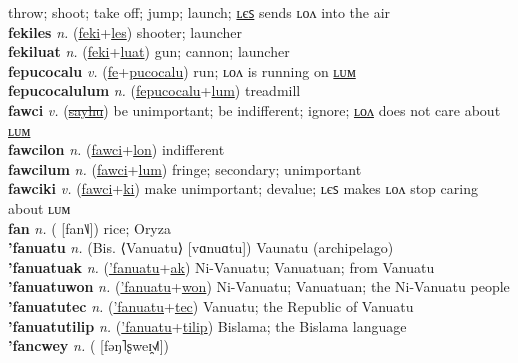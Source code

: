throw; shoot; take off; jump; launch; \hyperref[fekiles]{ʟєꜱ} sends ʟᴏᴧ into the air \label{feki} \\
\textbf{fekiles} \textit{n.} (\hyperref[feki]{feki}+\hyperref[les]{les})
shooter; launcher \label{fekiles} \\
\textbf{fekiluat} \textit{n.} (\hyperref[feki]{feki}+\hyperref[luat]{luat})
gun; cannon; launcher \label{fekiluat} \\
\textbf{fepucocalu} \textit{v.} (\hyperref[fe]{fe}+\hyperref[pucocalu]{pucocalu})
run; ʟᴏᴧ is running on \hyperref[fepucocalulum]{ʟᴜᴍ} \label{fepucocalu} \\
\textbf{fepucocalulum} \textit{n.} (\hyperref[fepucocalu]{fepucocalu}+\hyperref[lum]{lum})
treadmill \label{fepucocalulum} \\
\textbf{fawci} \textit{v.} (\hyperref[sayhu]{\sout{sayhu}})
be unimportant; be indifferent; ignore; \hyperref[fawcilon]{ʟᴏᴧ} does not care about \hyperref[fawcilum]{ʟᴜᴍ} \label{fawci} \\
\textbf{fawcilon} \textit{n.} (\hyperref[fawci]{fawci}+\hyperref[lon]{lon})
indifferent \label{fawcilon} \\
\textbf{fawcilum} \textit{n.} (\hyperref[fawci]{fawci}+\hyperref[lum]{lum})
fringe; secondary; unimportant \label{fawcilum} \\
\textbf{fawciki} \textit{v.} (\hyperref[fawci]{fawci}+\hyperref[ki]{ki})
make unimportant; devalue; ʟєꜱ makes ʟᴏᴧ stop caring about ʟᴜᴍ \label{fawciki} \\
\textbf{fan} \textit{n.} ( [fan˥˩])
rice; Oryza \label{fan} \\
\textbf{'fanuatu} \textit{n.} (Bis. ⟨Vanuatu⟩ [vɑnuɑtu])
Vaunatu (archipelago) \label{'fanuatu} \\
\textbf{'fanuatuak} \textit{n.} (\hyperref['fanuatu]{'fanuatu}+\hyperref[ak]{ak})
Ni-Vanuatu; Vanuatuan; from Vanuatu \label{'fanuatuak} \\
\textbf{'fanuatuwon} \textit{n.} (\hyperref['fanuatu]{'fanuatu}+\hyperref[won]{won})
Ni-Vanuatu; Vanuatuan; the Ni-Vanuatu people \label{'fanuatuwon} \\
\textbf{'fanuatutec} \textit{n.} (\hyperref['fanuatu]{'fanuatu}+\hyperref[tec]{tec})
Vanuatu; the Republic of Vanuatu \label{'fanuatutec} \\
\textbf{'fanuatutilip} \textit{n.} (\hyperref['fanuatu]{'fanuatu}+\hyperref[tilip]{tilip})
Bislama; the Bislama language \label{'fanuatutilip} \\
\textbf{'fancwey} \textit{n.} ( [fəŋ˥ʂweɪ̯˧˩˥])
